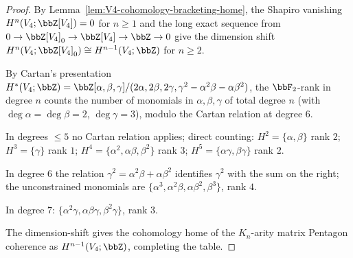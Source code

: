 \begin{proof}
By Lemma~\ref{lem:V4-cohomology-bracketing-home}, the Shapiro vanishing
$H^n(V_4; \bbZ[V_4]) = 0$ for $n \geq 1$ and the long exact sequence from
$0 \to \bbZ[V_4]_0 \to \bbZ[V_4] \to \bbZ \to 0$ give the dimension shift
$H^n(V_4; \bbZ[V_4]_0) \cong H^{n-1}(V_4; \bbZ)$ for $n \geq 2$.

By Cartan's presentation
$H^*(V_4; \bbZ) = \bbZ[\alpha, \beta, \gamma]/(2\alpha, 2\beta, 2\gamma,
 \gamma^2 - \alpha^2\beta - \alpha\beta^2)$, the $\bbF_2$-rank in degree
$n$ counts the number of monomials in $\alpha, \beta, \gamma$ of total degree
$n$ \textup{(}with $\deg\alpha = \deg\beta = 2$, $\deg\gamma = 3$\textup{)},
modulo the Cartan relation at degree $6$.

In degrees $\leq 5$ no Cartan relation applies; direct counting:
$H^2 = \{\alpha, \beta\}$ rank $2$; $H^3 = \{\gamma\}$ rank $1$;
$H^4 = \{\alpha^2, \alpha\beta, \beta^2\}$ rank $3$;
$H^5 = \{\alpha\gamma, \beta\gamma\}$ rank $2$.

In degree $6$ the relation $\gamma^2 = \alpha^2\beta + \alpha\beta^2$
identifies $\gamma^2$ with the sum on the right; the unconstrained
monomials are $\{\alpha^3, \alpha^2\beta, \alpha\beta^2, \beta^3\}$, rank $4$.

In degree $7$: $\{\alpha^2\gamma, \alpha\beta\gamma, \beta^2\gamma\}$, rank $3$.

The dimension-shift gives the cohomology home of the $K_n$-arity matrix
Pentagon coherence as $H^{n-1}(V_4; \bbZ)$, completing the table.
\end{proof}

